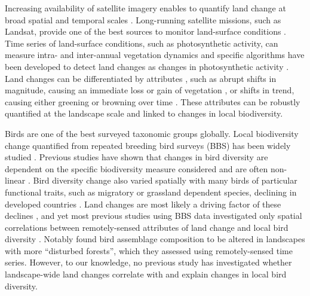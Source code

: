 Increasing availability of satellite imagery enables to quantify land change at broad spatial and temporal scales \citep{Kennedy2014,Pasquarella2016}. Long-running satellite missions, such as Landsat, provide one of the best sources to monitor land-surface conditions \citep{Kennedy2014,Vogelmann2016,Hermosilla2018,Song2018}. Time series of land-surface conditions, such as photosynthetic activity, can measure intra- and inter-annual vegetation dynamics \citep{Pettorelli2005,Fisher2006} and specific algorithms have been developed to detect land changes as changes in photosynthetic activity \citep{Verbesselt2010,Zhu2017}. Land changes can be differentiated by attributes \citep{Watson2014}, such as abrupt shifts in magnitude, causing an immediate loss or gain of vegetation \citep{DeVries2015b}, or shifts in trend, causing either greening or browning over time \citep{dejong2013,Muller2014}. These attributes can be robustly quantified at the landscape scale and linked to changes in local biodiversity.

Birds are one of the best surveyed taxonomic groups globally. Local biodiversity change quantified from repeated breeding bird surveys (BBS) has been widely studied \citep{Harrison2014,Pardieck2018}. Previous studies have shown that changes in bird diversity are dependent on the specific biodiversity measure     considered \citep{Schipper2016,Jarzyna2017} and are often non-linear \citep{Gutzwiller2015,Barnagaud2017}. Bird diversity change also varied spatially \citep{Harrison2014,Jarzyna2017} with many birds of particular functional traits, such as migratory or grassland dependent species, declining in developed countries \citep{Fewster2000,Sanderson2006,Stanton2018}. Land changes are most likely a driving factor of these declines \citep{Harrison2014,Harrison2016}, and yet most previous studies using BBS data investigated only spatial correlations between remotely-sensed attributes of land change and local bird diversity \citep{Rowhani2008,Goetz2014,Hobi2017}. Notably \cite{Rittenhouse2010} found bird assemblage composition to be altered in landscapes with more “disturbed forests”, which they assessed using remotely-sensed time series. However, to our knowledge, no previous study has investigated whether landscape-wide land changes correlate with and explain changes in local bird diversity.


